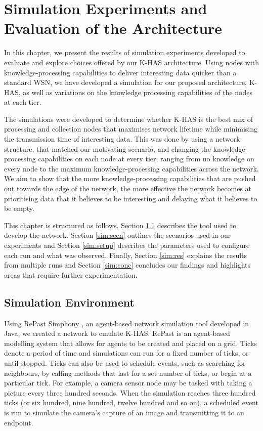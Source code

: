 \chapter{Simulation Experiments and Evaluation of the Architecture}
In this chapter, we present the results of simulation experiments developed to evaluate and explore choices offered by our K-HAS architecture. Using nodes with knowledge-processing capabilities to deliver interesting data quicker than a standard WSN, we have developed a simulation for our proposed architecture, K-HAS, as well as variations on the knowledge processing capabilities of the nodes at each tier.

The simulations were developed to determine whether K-HAS is the best mix of processing and collection nodes that maximises network lifetime while minimising the transmission time of interesting data. This was done by using a network structure, that matched our motivating scenario, and changing the knowledge-processing capabilities on each node at every tier; ranging from no knowledge on every node to the maximum knowledge-processing capabilities across the network. We aim to show that the more knowledge-processing capabilities that are pushed out towards the edge of the network, the more effective the network becomes at prioritising data that it believes to be interesting and delaying what it believes to be empty.

This chapter is structured as follows. Section \ref{sim:env} describes the tool used to develop the network. Section \ref{sim:scen} outlines the scenarios used in our experiments and Section \ref{sim:setup} describes the parameters used to configure each run and what was observed. Finally, Section \ref{sim:res} explains the results from multiple runs and Section \ref{sim:conc} concludes our findings and highlights areas that require further experimentation.

\section{Simulation Environment}\label{sim:env}
Using RePast Simphony \cite{Collier2003}, an agent-based network simulation tool developed in Java, we created a network to emulate K-HAS. RePast is an agent-based modelling system that allows for agents to be created and placed on a grid. Ticks denote a period of time and simulations can run for a fixed number of ticks, or until stopped. Ticks can also be used to schedule events, such as searching for neighbours, by calling methods that last for a set number of ticks, or begin at a particular tick. For example, a camera sensor node may be tasked with taking a picture every three hundred seconds. When the simulation reaches three hundred ticks (or six hundred, nine hundred, twelve hundred and so on), a scheduled event is run to simulate the camera's capture of an image and transmitting it to an endpoint.

